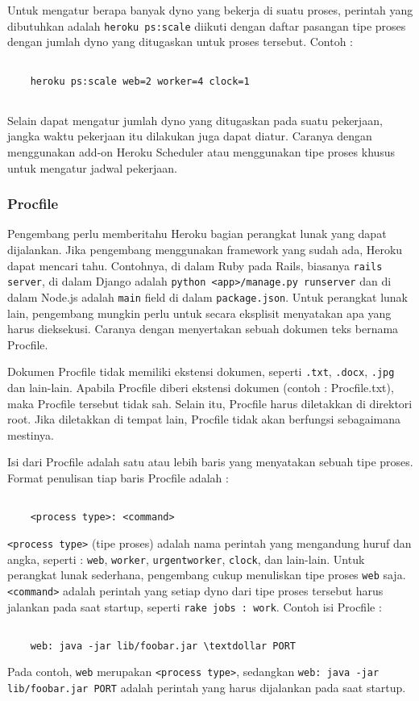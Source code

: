 Untuk mengatur berapa banyak dyno yang bekerja di suatu proses, perintah yang dibutuhkan adalah \texttt{heroku ps:scale} diikuti dengan daftar pasangan tipe proses dengan jumlah dyno yang ditugaskan untuk proses tersebut. Contoh :
\begin{lstlisting}

	heroku ps:scale web=2 worker=4 clock=1
	
\end{lstlisting}

Selain dapat mengatur jumlah dyno yang ditugaskan pada suatu pekerjaan, jangka waktu pekerjaan itu dilakukan juga dapat diatur. Caranya dengan menggunakan add-on Heroku Scheduler atau menggunakan tipe proses khusus untuk mengatur jadwal pekerjaan.

\subsubsection{Procfile}
Pengembang perlu memberitahu Heroku bagian perangkat lunak yang dapat dijalankan. Jika pengembang menggunakan framework yang sudah ada, Heroku dapat mencari tahu. Contohnya, di dalam Ruby pada Rails, biasanya \texttt{rails server}, di dalam Django adalah \texttt{python <app>/manage.py runserver} dan di dalam Node.js adalah \texttt{main} field di dalam \texttt{package.json}. Untuk perangkat lunak lain, pengembang mungkin perlu untuk secara eksplisit menyatakan apa yang harus dieksekusi. Caranya dengan menyertakan sebuah dokumen teks bernama Procfile. 

Dokumen Procfile tidak memiliki ekstensi dokumen, seperti \texttt{.txt}, \texttt{.docx}, \texttt{.jpg} dan lain-lain. Apabila Procfile diberi ekstensi dokumen (contoh : Procfile.txt), maka Procfile tersebut tidak sah. Selain itu, Procfile harus diletakkan di direktori root. Jika diletakkan di tempat lain, Procfile tidak akan berfungsi sebagaimana mestinya.

Isi dari Procfile adalah satu atau lebih baris yang menyatakan sebuah tipe proses. Format penulisan tiap baris Procfile adalah : 
\begin{lstlisting}

	<process type>: <command>

\end{lstlisting}
\texttt{<process type>} (tipe proses) adalah nama perintah yang mengandung huruf dan angka, seperti : \texttt{web}, \texttt{worker}, \texttt{urgentworker}, \texttt{clock}, dan lain-lain. Untuk perangkat lunak sederhana, pengembang cukup menuliskan tipe proses \texttt{web} saja. \texttt{<command>} adalah perintah yang setiap dyno dari tipe proses tersebut harus jalankan pada saat startup, seperti \texttt{rake jobs : work}. Contoh isi Procfile :
\begin{lstlisting}

	web: java -jar lib/foobar.jar \textdollar PORT

\end{lstlisting}
Pada contoh, \texttt{web} merupakan \texttt{<process type>}, sedangkan \texttt{web: java -jar lib/foobar.jar \textdollar PORT} adalah perintah yang harus dijalankan pada saat startup.

